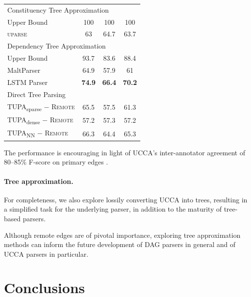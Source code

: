 \documentclass[a0,portrait]{a0poster}
\newcommand{\parser}[1]{TUPA\textsubscript{#1}}
\begin{document}
\begin{multicols}{2}
\begin{table}
\hspace{-6mm}
\begin{tabular}{l|ccc}
\hline
\multicolumn{4}{l}{\rule{0pt}{2ex} \footnotesize Constituency Tree Approximation} \\
Upper Bound & 100 & 100 & 100 \vspace{.1cm} \\
\textsc{uparse} \cite{maier-lichte:2016:DiscoNLP} & 63 & 64.7 & 63.7 \\
\hline
\multicolumn{4}{l}{\rule{0pt}{2ex} \footnotesize Dependency Tree Approximation} \\
Upper Bound & 93.7 & 83.6 & 88.4 \vspace{.1cm} \\
MaltParser \cite{nivre2007maltparser} & 64.9 & 57.9 & 61 \\
LSTM Parser \cite{dyer2015transition} & {\bf 74.9} & {\bf 66.4} & {\bf 70.2} \\
\hline
\multicolumn{4}{l}{\rule{0pt}{2ex} \footnotesize Direct Tree Parsing} \\
\parser{sparse} $-$ \textsc{Remote} & 65.5 & 57.5 & 61.3 \\
\parser{dense} $-$ \textsc{Remote} & 57.2 & 57.3 & 57.2 \\
\parser{NN} $-$ \textsc{Remote} & 66.3 & 64.4 & 65.3 \\
\end{tabular}
\end{table}

The performance is encouraging in light of
UCCA's inter-annotator agreement of 80--85\%
F-score on primary edges \cite{abend2013universal}.



\paragraph{Tree approximation.}

For completeness, we also explore lossily converting UCCA into trees,
resulting in a simplified task for the underlying parser,
in addition to the maturity of tree-based parsers.

Although remote edges are of pivotal importance, exploring tree approximation methods
can inform the future development of DAG parsers in general and of UCCA parsers in particular.



\section*{Conclusions}


\end{multicols}
\end{document}
